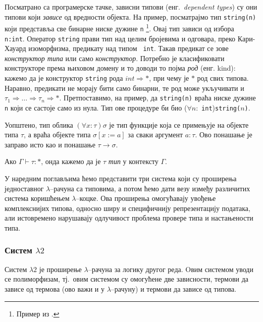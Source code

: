 Посматрано са програмерске тачке, зависни типови (енг.~\emph{dependent
  types}) су они типови који \emph{зависе} од вредности објекта. На
пример, посматрајмо тип {\tt string(n)} који представља све бинарне
ниске дужине {\tt n} \footnote{Пример из
  \cite{mitchell1996foundations}.}. Овај тип зависи од избора {\tt
  n:int}. Оператор {\tt string} прави тип над целим бројевима и
одговара, преко Кари-Хауард изоморфизма, предикату над типом {\tt
  int}. Такав предикат се зове \emph{конструктор типа} или само
\emph{конструктор}. Потребно је класификовати конструкторе према
њиховом домену и то доводи то појма \emph{род} (енг. kind): кажемо да
је конструктор {\tt string} рода $int \Rightarrow *$, при чему је $*$
род свих типова. Наравно, предикати не морају бити само бинарни, те
род може укључивати и $\tau_1 \Rightarrow \ldots \Rightarrow \tau_n
\Rightarrow *$. Претпоставимо, на пример, да {\tt string(n)} враћа
ниске дужине {\tt n} који се састоје само из нула. Тип ове процедуре
би био ($\forall n :$ {\tt int}){\tt string($n$)}.

Уопштено, тип облика $(\forall x:\tau)\sigma$ је тип функције која се
примењује на објекте типа $\tau$, а враћа објекте типа $\sigma[x :=
  a]$ за сваки аргумент $a : \tau$. Ово понашање је заправо исто као и
понашање $\tau \to \sigma$.

\begin{definition}
Ако $\Gamma \vdash \tau : *$, онда кажемо да је $\tau$ \emph{тип} у
контексту $\Gamma$.
\end{definition}

У наредним поглављима ћемо представити три система који су проширења
једноставног $\lambda$--рачуна са типовима, а потом ћемо дати везу
између различитих система коришћењем $\lambda$--коцке. Ова проширења
омогућавају увођење комплекснијих типова, односно ширу и специфичнију
репрезентацију података, али истовремено нарушавају одлучивост
проблема провере типа и настањености типа.

\subsubsection{Систем $\lambda2$}

Систем $\lambda2$ је проширење $\lambda$--рачуна за логику другог
реда. Oвим системом уводи се полиморфизам, тј.~овим системом су
омогућене две зависности, термови да зависе од термова (ово важи и у
$\lambda$--рачуну) и термови да зависе од типова.

